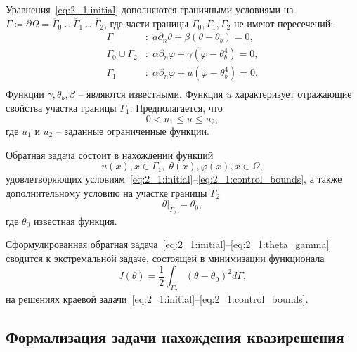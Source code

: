 Уравнения~\eqref{eq:2_1:initial} дополняются граничными условиями на
$\Gamma \coloneqq \partial \Omega =\overline{\Gamma}_0 \cup \overline{\Gamma}_1 \cup \overline{\Gamma}_2$,
где части границы $\Gamma_0, \Gamma_1, \Gamma_2$ не имеют пересечений:
\begin{equation}
    \label{eq:2_1:initial-boundary}
    \begin{aligned}
        \Gamma &: \; a \partial_n \theta + \beta (\theta - \theta _b) = 0, \\
        \Gamma_0 \cup \Gamma_2 &: \; \alpha \partial_n \varphi
        + \gamma(\varphi - \theta_b ^4 ) = 0, \\
        \Gamma_1 &: \; \alpha \partial_n \varphi + u(\varphi - \theta_b ^4 ) = 0. \\
    \end{aligned}
\end{equation}
Функции $\gamma, \theta_b, \beta$ -- являются известными.
Функция $u$ характеризует отражающие свойства участка границы $\Gamma_1$.
Предполагается, что
\begin{equation}
    \label{eq:2_1:control_bounds}
    0 < u_1 \leq u \leq u_2,
\end{equation}
где $u_1$ и $u_2$ -- заданные ограниченные функции.


Обратная задача состоит в нахождении функций
\[
    u(x), x \in  \Gamma_1, \; \theta(x), \varphi(x), x \in \Omega,
\]
удовлетворяющих условиям~\eqref{eq:2_1:initial}--\eqref{eq:2_1:control_bounds},
а также дополнительному условию на участке границы $\Gamma_2$
\begin{equation}
    \label{eq:2_1:theta_gamma}
    \theta|_{\Gamma_2}=\theta_0,
\end{equation}
где $\theta_0$ известная функция.


Сформулированная обратная задача~\eqref{eq:2_1:initial}--\eqref{eq:2_1:theta_gamma}
сводится к экстремальной задаче,
состоящей в минимизации функционала
\begin{equation}
    \label{eq:2_1:quality}
    J(\theta) = \frac{1}{2} \int_{\Gamma_2} (\theta - \theta_0)^2 d\Gamma,
\end{equation}
на решениях краевой задачи~\eqref{eq:2_1:initial}--\eqref{eq:2_1:control_bounds}.

\subsection{Формализация задачи нахождения квазирешения}\label{subsec:ch2/sec1/subsec2}


